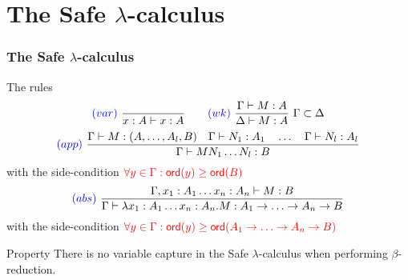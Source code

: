 \section{The Safe \texorpdfstring{$\lambda$}{lambda}-calculus}
\begin{frame} \frametitle{The Safe $\lambda$-calculus}
\begin{block}{The rules}
$$ \textcolor{blue}{(var)} \   \frac{\displaystyle }{x : A\vdash x : A}
\qquad  \textcolor{blue}{(wk)} \   \frac{\displaystyle \Gamma \vdash M : A}{\Delta \vdash
M : A} \ \Gamma \subset \Delta$$
$$ \textcolor{blue}{(app)} \  \frac{\displaystyle \Gamma \vdash M : (A,\ldots,A_l,B)
                                        \quad \Gamma \vdash N_1 : A_1
                                        \quad \ldots \quad \Gamma \vdash N_l : A_l  }{\Gamma  \vdash M N_1 \ldots N_l : B}$$
\hfill with the side-condition $\textcolor{red}{\forall y \in \Gamma
: {\sf ord}(y) \geq {\sf ord}(B)}$
$$ \textcolor{blue}{(abs)} \   \frac{\displaystyle \Gamma, x_1:A_1 \ldots x_n : A_n \vdash M : B}{\Gamma  \vdash \lambda x_1:A_1 \ldots x_n : A_n . M : A_1 \rightarrow \ldots \rightarrow A_n \rightarrow B}$$
\hfill with the side-condition $\textcolor{red}{\forall y \in \Gamma
: {\sf ord}(y) \geq {\sf ord}(A_1 \rightarrow \ldots \rightarrow A_n
\rightarrow B)}$
\end{block}

\begin{block}{Property}
There is no variable capture in the Safe $\lambda$-calculus when
performing $\beta$-reduction.
\end{block}
\end{frame}



